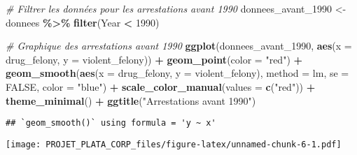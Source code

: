 \documentclass[
]{article}
\newenvironment{Shaded}{\begin{snugshade}}{\end{snugshade}}
\newcommand{\AttributeTok}[1]{\textcolor[rgb]{0.13,0.29,0.53}{#1}}
\newcommand{\CommentTok}[1]{\textcolor[rgb]{0.56,0.35,0.01}{\textit{#1}}}
\newcommand{\ConstantTok}[1]{\textcolor[rgb]{0.56,0.35,0.01}{#1}}
\newcommand{\DecValTok}[1]{\textcolor[rgb]{0.00,0.00,0.81}{#1}}
\newcommand{\FunctionTok}[1]{\textcolor[rgb]{0.13,0.29,0.53}{\textbf{#1}}}
\newcommand{\NormalTok}[1]{#1}
\newcommand{\OtherTok}[1]{\textcolor[rgb]{0.56,0.35,0.01}{#1}}
\newcommand{\SpecialCharTok}[1]{\textcolor[rgb]{0.81,0.36,0.00}{\textbf{#1}}}
\newcommand{\StringTok}[1]{\textcolor[rgb]{0.31,0.60,0.02}{#1}}
\begin{document}
\begin{Shaded}
\begin{Highlighting}[]
\CommentTok{\# Filtrer les données pour les arrestations avant 1990}
\NormalTok{donnees\_avant\_1990 }\OtherTok{\textless{}{-}}\NormalTok{ donnees }\SpecialCharTok{\%\textgreater{}\%} \FunctionTok{filter}\NormalTok{(Year }\SpecialCharTok{\textless{}} \DecValTok{1990}\NormalTok{)}

\CommentTok{\# Graphique des arrestations avant 1990}
\FunctionTok{ggplot}\NormalTok{(donnees\_avant\_1990, }\FunctionTok{aes}\NormalTok{(}\AttributeTok{x =}\NormalTok{ drug\_felony, }\AttributeTok{y =}\NormalTok{ violent\_felony)) }\SpecialCharTok{+} 
  \FunctionTok{geom\_point}\NormalTok{(}\AttributeTok{color =} \StringTok{"red"}\NormalTok{) }\SpecialCharTok{+}
  \FunctionTok{geom\_smooth}\NormalTok{(}\FunctionTok{aes}\NormalTok{(}\AttributeTok{x =}\NormalTok{ drug\_felony, }\AttributeTok{y =}\NormalTok{ violent\_felony), }\AttributeTok{method =}\NormalTok{ lm, }\AttributeTok{se =} \ConstantTok{FALSE}\NormalTok{, }\AttributeTok{color =} \StringTok{"blue"}\NormalTok{) }\SpecialCharTok{+}
  \FunctionTok{scale\_color\_manual}\NormalTok{(}\AttributeTok{values =} \FunctionTok{c}\NormalTok{(}\StringTok{"red"}\NormalTok{)) }\SpecialCharTok{+}
  \FunctionTok{theme\_minimal}\NormalTok{() }\SpecialCharTok{+}
  \FunctionTok{ggtitle}\NormalTok{(}\StringTok{"Arrestations avant 1990"}\NormalTok{)}
\end{Highlighting}
\end{Shaded}

\begin{verbatim}
## `geom_smooth()` using formula = 'y ~ x'
\end{verbatim}

\texttt{[image: PROJET\_PLATA\_CORP\_files/figure-latex/unnamed-chunk-6-1.pdf]}
\end{document}
